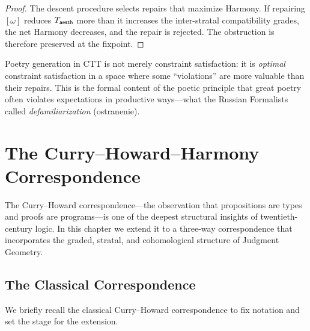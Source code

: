 \begin{proof}
The descent procedure selects repairs that maximize Harmony.  If
repairing $[\omega]$ reduces $T_{\mathsf{aesth}}$ more than it increases the
inter-stratal compatibility grades, the net Harmony decreases, and
the repair is rejected.  The obstruction is therefore preserved at
the fixpoint.
\end{proof}

\begin{remark}
Poetry generation in CTT is not merely constraint satisfaction: it
is \emph{optimal} constraint satisfaction in a space where some
``violations'' are more valuable than their repairs.  This is the
formal content of the poetic principle that great poetry often
violates expectations in productive ways---what the Russian
Formalists called \emph{defamiliarization} (ostranenie).
\end{remark}

\chapter{The Curry--Howard--Harmony Correspondence}
\label{ch:chh}

The Curry--Howard correspondence---the observation that propositions
are types and proofs are programs---is one of the deepest structural
insights of twentieth-century logic.  In this chapter we extend it
to a three-way correspondence that incorporates the graded, stratal,
and cohomological structure of Judgment Geometry.

\section{The Classical Correspondence}
\label{sec:classical-ch}

We briefly recall the classical Curry--Howard correspondence to fix
notation and set the stage for the extension.

